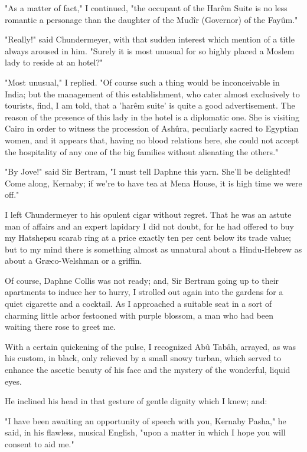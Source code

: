 "As a matter of fact," I continued, "the occupant of the Harêm Suite
is no less romantic a personage than the daughter of the Mudîr
(Governor) of the Fayûm."

"Really!" said Chundermeyer, with that sudden interest which mention
of a title always aroused in him. "Surely it is most unusual for so
highly placed a Moslem lady to reside at an hotel?"

"Most unusual," I replied. "Of course such a thing would be
inconceivable in India; but the management of this establishment, who
cater almost exclusively to tourists, find, I am told, that a 'harêm
suite' is quite a good advertisement. The reason of the presence of
this lady in the hotel is a diplomatic one. She is visiting Cairo in
order to witness the procession of Ashûra, peculiarly sacred to
Egyptian women, and it appears that, having no blood relations here,
she could not accept the hospitality of any one of the big families
without alienating the others."

"By Jove!" said Sir Bertram, "I must tell Daphne this yarn. She'll be
delighted! Come along, Kernaby; if we're to have tea at Mena House, it
is high time we were off."

I left Chundermeyer to his opulent cigar without regret. That he was
an astute man of affairs and an expert lapidary I did not doubt, for
he had offered to buy my Hatshepsu scarab ring at a price exactly ten
per cent below its trade value; but to my mind there is something
almost as unnatural about a Hindu-Hebrew as about a Græco-Welshman or
a griffin.

Of course, Daphne Collis was not ready; and, Sir Bertram going up to
their apartments to induce her to hurry, I strolled out again into the
gardens for a quiet cigarette and a cocktail. As I approached a
suitable seat in a sort of charming little arbor festooned with purple
blossom, a man who had been waiting there rose to greet me.

With a certain quickening of the pulse, I recognized Abû Tabâh,
arrayed, as was his custom, in black, only relieved by a small snowy
turban, which served to enhance the ascetic beauty of his face and the
mystery of the wonderful, liquid eyes.

He inclined his head in that gesture of gentle dignity which I knew;
and:

"I have been awaiting an opportunity of speech with you, Kernaby
Pasha," he said, in his flawless, musical English, "upon a matter in
which I hope you will consent to aid me."

